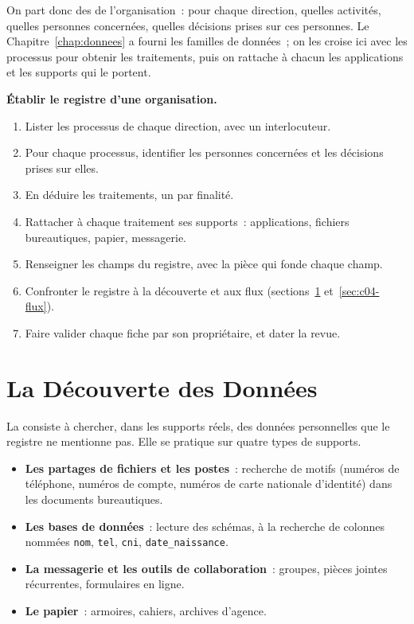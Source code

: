 On part donc des  de l'organisation~: pour chaque
direction, quelles activités, quelles personnes concernées, quelles
décisions prises sur ces personnes. Le Chapitre~\ref{chap:donnees} a fourni
les familles de données~; on les croise ici avec les processus pour obtenir
les traitements, puis on rattache à chacun les applications et les supports
qui le portent.

\begin{boxprocedure}
\textbf{Établir le registre d'une organisation.}
\begin{enumerate}
    \item Lister les processus de chaque direction, avec un interlocuteur.
    \item Pour chaque processus, identifier les personnes concernées et les
          décisions prises sur elles.
    \item En déduire les traitements, un par finalité.
    \item Rattacher à chaque traitement ses supports~: applications,
          fichiers bureautiques, papier, messagerie.
    \item Renseigner les champs du registre, avec la pièce qui fonde chaque
          champ.
    \item Confronter le registre à la découverte et aux flux
          (sections~\ref{sec:c04-decouverte} et~\ref{sec:c04-flux}).
    \item Faire valider chaque fiche par son propriétaire, et dater la
          revue.
\end{enumerate}
\end{boxprocedure}

\section{La Découverte des Données}
\label{sec:c04-decouverte}

La  consiste à chercher, dans les supports
réels, des données personnelles que le registre ne mentionne pas. Elle se
pratique sur quatre types de supports.

\begin{itemize}
    \item \textbf{Les partages de fichiers et les postes}~: recherche de
          motifs (numéros de téléphone, numéros de compte, numéros de carte
          nationale d'identité) dans les documents bureautiques.
    \item \textbf{Les bases de données}~: lecture des schémas, à la
          recherche de colonnes nommées \texttt{nom}, \texttt{tel},
          \texttt{cni}, \texttt{date\_naissance}.
    \item \textbf{La messagerie et les outils de collaboration}~: groupes,
          pièces jointes récurrentes, formulaires en ligne.
    \item \textbf{Le papier}~: armoires, cahiers, archives d'agence.
\end{itemize}

